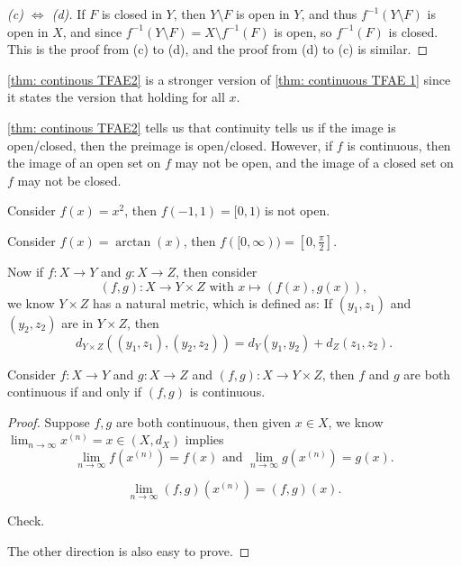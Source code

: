 \begin{proof}[(c) \(\iff \) (d)]
    If \(F\) is closed in \(Y\), then \(Y \setminus F\) is open in \(Y\), and thus \(f^{-1}(Y \setminus F) \) is open in \(X\), and since \(f^{-1} (Y \setminus F) = X \setminus f^{-1}(F) \) is open, so \(f^{-1}(F) \) is closed. This is the proof from (c) to (d), and the proof from (d) to (c) is similar.      
\end{proof}

\begin{note}
    \autoref{thm: continous TFAE2} is a stronger version of \autoref{thm: continuous TFAE 1} since it states the version that holding for all \(x\).   
\end{note}

\begin{remark}
    \autoref{thm: continous TFAE2} tells us that continuity tells us if the image is open/closed, then the preimage is open/closed. However, if \(f\) is continuous, then the image of an open set on \(f\) may not be open, and the image of a closed set on \(f\) may not be closed.     
\end{remark}

\begin{eg}
    Consider \(f(x) = x^2\), then \(f(-1, 1) = [0, 1)\) is not open.   
\end{eg}

\begin{eg}
    Consider \(f(x) = \arctan (x)\), then \(f([0, \infty )) = [0, \frac{\pi}{2}]\).  
\end{eg}

Now if \(f: X \to Y\) and \(g: X \to Z\), then consider
\[
    (f, g) : X \to Y \times Z \text{ with } x \mapsto (f(x), g(x)),
\] we know \(Y \times Z\) has a natural metric, which is defined as: If \((y_1, z_1) \) and \((y_2, z_2)\) are in \(Y \times Z\), then 
\[
    d_{Y \times Z}\left( (y_1, z_1), (y_2, z_2) \right) = d_Y(y_1, y_2) + d_Z(z_1, z_2). 
\]    

\begin{lemma}
    Consider \(f: X \to Y\) and \(g: X \to Z\) and \((f, g): X \to Y \times Z\), then \(f\) and \(g\) are both continuous if and only if \((f, g)\) is continuous.       
\end{lemma}
\begin{proof}
    Suppose \(f, g\) are both continuous, then given \(x \in X\), we know \(\lim_{n \to \infty} x^{(n)} = x \in (X, d_X) \) implies 
    \[
        \lim_{n \to \infty} f \left( x^{(n)} \right) = f(x) \text{ and } \lim_{n \to \infty} g \left( x^{(n)} \right) = g(x).    
    \] 
    \begin{claim}
        \[
            \lim_{n \to \infty} (f, g) \left( x^{(n)} \right) = (f, g)(x). 
        \]
    \end{claim}
    \begin{explanation}
        Check.
    \end{explanation}
    The other direction is also easy to prove.
\end{proof}